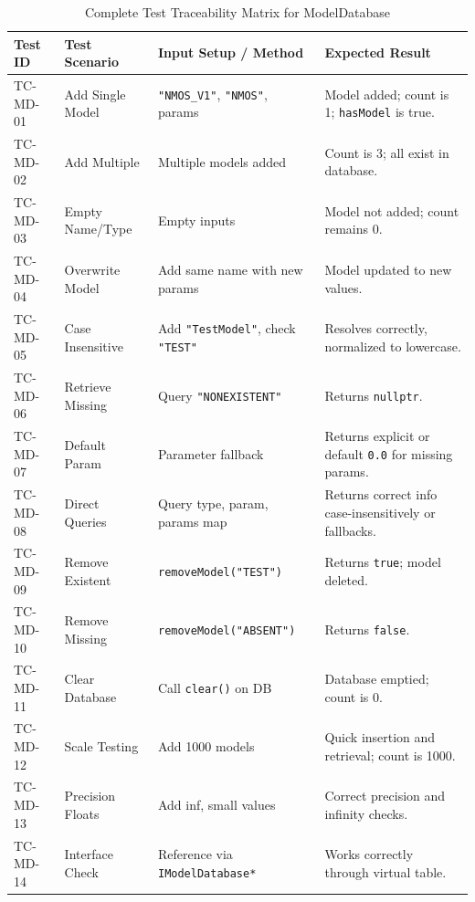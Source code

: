 \begin{table}[H]
\centering
\small
\begin{tabular}{|l|l|p{4.5cm}|p{4.5cm}|}
\hline
\textbf{Test ID} & \textbf{Test Scenario} & \textbf{Input Setup / Method} & \textbf{Expected Result} \\
\hline
TC-MD-01 & Add Single Model & \texttt{"NMOS\_V1"}, \texttt{"NMOS"}, params & Model added; count is 1; \texttt{hasModel} is true. \\
\hline
TC-MD-02 & Add Multiple & Multiple models added & Count is 3; all exist in database. \\
\hline
TC-MD-03 & Empty Name/Type & Empty inputs & Model not added; count remains 0. \\
\hline
TC-MD-04 & Overwrite Model & Add same name with new params & Model updated to new values. \\
\hline
TC-MD-05 & Case Insensitive & Add \texttt{"TestModel"}, check \texttt{"TEST"} & Resolves correctly, normalized to lowercase. \\
\hline
TC-MD-06 & Retrieve Missing & Query \texttt{"NONEXISTENT"} & Returns \texttt{nullptr}. \\
\hline
TC-MD-07 & Default Param & Parameter fallback & Returns explicit or default \texttt{0.0} for missing params. \\
\hline
TC-MD-08 & Direct Queries & Query type, param, params map & Returns correct info case-insensitively or fallbacks. \\
\hline
TC-MD-09 & Remove Existent & \texttt{removeModel("TEST")} & Returns \texttt{true}; model deleted. \\
\hline
TC-MD-10 & Remove Missing & \texttt{removeModel("ABSENT")} & Returns \texttt{false}. \\
\hline
TC-MD-11 & Clear Database & Call \texttt{clear()} on DB & Database emptied; count is 0. \\
\hline
TC-MD-12 & Scale Testing & Add 1000 models & Quick insertion and retrieval; count is 1000. \\
\hline
TC-MD-13 & Precision Floats & Add inf, small values & Correct precision and infinity checks. \\
\hline
TC-MD-14 & Interface Check & Reference via \texttt{IModelDatabase*} & Works correctly through virtual table. \\
\hline
\end{tabular}
\caption{Complete Test Traceability Matrix for ModelDatabase}
\end{table}


